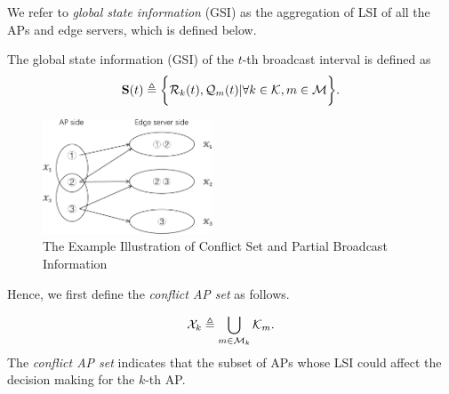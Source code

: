 We refer to \emph{global state information} (GSI) as the aggregation of LSI of all the APs and edge servers, which is defined below.
\begin{definition}
    The global state information (GSI) of the $t$-th broadcast interval is defined as
    \begin{align}
        \mathbf{S}(t) \triangleq
            \bigg\{
                \mathcal{R}_{k}(t), \mathcal{Q}_{m}(t) | \forall k\in\mathcal{K}, m\in\mathcal{M}
            \bigg\}.
    \end{align}
\end{definition}


\begin{figure}[tp]
    \centering
    \includegraphics[width=0.45\textwidth]{images/conflict.pdf}
    \caption{The Example Illustration of Conflict Set and Partial Broadcast Information}
    \label{fig:conflict}
\end{figure}

Hence, we first define the \emph{conflict AP set} as follows.
\begin{definition}
    \begin{align}
        \mathcal{X}_{k} \triangleq \bigcup_{m\in\mathcal{M}_{k}} \mathcal{K}_{m}.
    \end{align}
    The \emph{conflict AP set} indicates that the subset of APs whose LSI could affect the decision making for the $k$-th AP.
\end{definition}

